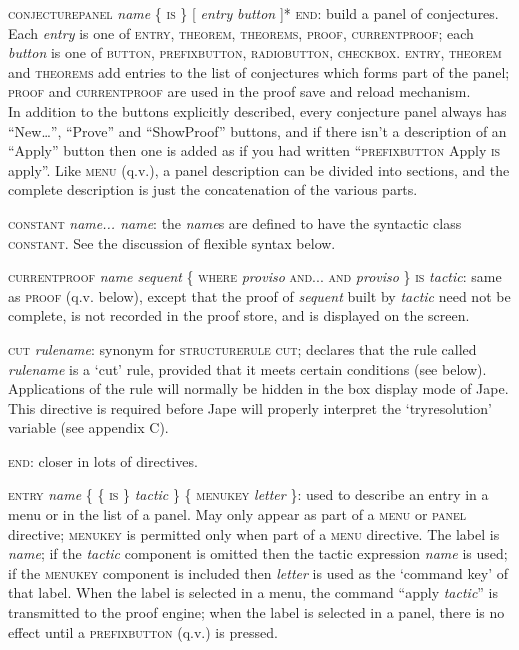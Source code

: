 \documentclass[11pt]{book}
\newcommand{\tab}{\hspace{5mm}}
\begin{document}
\textsc{conjecturepanel} \textit{name} \{ \textsc{is} \} [ \textit{entry} {\textbar} \textit{button} ]* \textsc{end}: build a panel of conjectures. Each \textit{entry} is one of \textsc{entry}, \textsc{theorem, theorems, proof, currentproof}; each \textit{button} is one of \textsc{button, prefixbutton, radiobutton, checkbox}. \textsc{entry}, \textsc{theorem} and \textsc{theorems} add entries to the list of conjectures which forms part of the panel; \textsc{proof} and \textsc{currentproof} are used in the proof save and reload mechanism. \\
\tab In addition to the buttons explicitly described, every conjecture panel always has ``New\dots '', ``Prove'' and ``Show{\nobreakspace}Proof'' buttons, and if there isn't a description of an ``Apply'' button then one is added as if you had written ``\textsc{prefixbutton} Apply \textsc{is} apply''. Like \textsc{menu} (q.v.), a panel description can be divided into sections, and the complete description is just the concatenation of the various parts.


\textsc{constant} \textit{name... name}: the \textit{name}s are defined to have the syntactic class \textsc{constant}. See the discussion of flexible syntax below.


\textsc{currentproof} \textit{name sequent} \{ \textsc{where} \textit{proviso} \textsc{and... and} \textit{proviso} \textsc{\} is} \textit{tactic}: same as \textsc{proof} (q.v. below), except that the proof of \textit{sequent} built by \textit{tactic} need not be complete, is not recorded in the proof store, and is displayed on the screen.


\textsc{cut} \textit{rulename}: synonym for \textsc{structurerule} \textsc{cut}; declares that the rule called \textit{rulename} is a `cut' rule, provided that it meets certain conditions (see below). Applications of the rule will normally be hidden in the box display mode of Jape. This directive is required before Jape will properly interpret the `tryresolution' variable (see appendix C).


\textsc{end:} closer in lots of directives.


\textsc{entry} \textit{name} \{ \{ \textsc{is} \} \textit{tactic} \} \{ \textsc{menukey} \textit{letter} \}: used to describe an entry in a menu or in the list of a panel. May only appear as part of a \textsc{menu} or \textsc{panel} directive; \textsc{menukey} is permitted only when part of a \textsc{menu} directive. The label is \textit{name}; if the \textit{tactic} component is omitted then the tactic expression \textit{name} is used; if the \textsc{menukey} component is included then \textit{letter} is used as the `command key' of that label. When the label is selected in a menu, the command ``apply \textit{tactic}'' is transmitted to the proof engine; when the label is selected in a panel, there is no effect until a \textsc{prefixbutton} (q.v.) is pressed.
\end{document}
